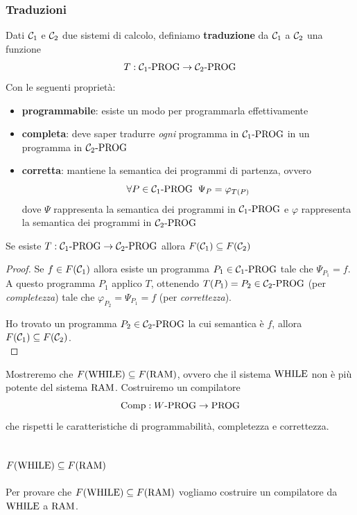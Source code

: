 \subsubsection{Traduzioni}
Dati $\mathcal{C}_1$ e $\mathcal{C}_2$ due sistemi di calcolo, definiamo \textbf{traduzione} da $\mathcal{C}_1$ a $\mathcal{C}_2$ una funzione
$$ T: \mathcal{C}_{1}\text{-}\text{PROG} \rightarrow \mathcal{C}_{2}\text{-}\text{PROG} $$
Con le seguenti proprietà:
\begin{itemize}
	\item \textbf{programmabile}: esiste un modo per programmarla effettivamente
	\item \textbf{completa}: deve saper tradurre \textit{ogni} programma in $\mathcal{C}_{1}\text{-}\text{PROG}$ in un programma in $\mathcal{C}_{2}\text{-}\text{PROG}$
	\item \textbf{corretta}: mantiene la semantica dei programmi di partenza, ovvero
	$$ \forall P \in \mathcal{C}_{1}\text{-}\text{PROG} \;\; \Psi_P = \varphi_{T(P)}$$
	dove $\Psi$ rappresenta la semantica dei programmi in $\mathcal{C}_{1}\text{-}\text{PROG}$ e $\varphi$ rappresenta la semantica dei programmi in $\mathcal{C}_{2}\text{-}\text{PROG}$ \\
\end{itemize}


\begin{theor}
	Se esiste $T: \mathcal{C}_{1}\text{-}\text{PROG} \rightarrow \mathcal{C}_{2}\text{-}\text{PROG}$ allora $F(\mathcal{C}_1) \subseteq F(\mathcal{C}_2)$
\end{theor}
\begin{proof}
	Se $f \in F(\mathcal{C}_1)$ allora esiste un programma $P_1 \in \mathcal{C}_{1}\text{-}\text{PROG}$ tale che $\Psi_{P_1} = f$.
	A questo programma $P_1$ applico $T$, ottenendo $T(P_1) = P_2 \in \mathcal{C}_{2}\text{-}\text{PROG}$ (per \textit{completezza}) tale che $\varphi_{P_2} = \Psi_{P_1} = f$ (per \textit{correttezza}).
	
	Ho trovato un programma $P_2 \in \mathcal{C}_{2}\text{-}\text{PROG}$ la cui semantica è $f$, allora $F(\mathcal{C}_1) \subseteq F(\mathcal{C}_2)$.\\
\end{proof}

Mostreremo che $F(\text{WHILE}) \subseteq F(\text{RAM})$, ovvero che il sistema $\text{WHILE}$ non è più potente del sistema $\text{RAM}$. Costruiremo un compilatore
$$ \text{Comp}: W\text{-PROG} \rightarrow \text{PROG} $$
che rispetti le caratteristiche di programmabilità, completezza e correttezza.

\subsection{$F(\text{WHILE}) \subseteq F(\text{RAM})$}

Per provare che $F(\text{WHILE}) \subseteq F(\text{RAM})$ vogliamo costruire un compilatore da $\text{WHILE}$ a $\text{RAM}$.

